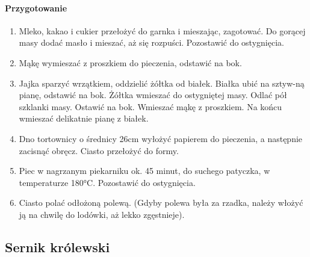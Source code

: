 \documentclass{article}
\begin{document}
    \paragraph{Przygotowanie}
    \begin{enumerate}
        \item Mleko, kakao i cukier przełożyć do garnka i mieszając, zagotować.
            Do gorącej masy dodać masło i mieszać, aż się rozpuści.  Pozostawić
            do ostygnięcia.
        \item Mąkę wymieszać z proszkiem do pieczenia, odstawić na bok.
        \item Jajka sparzyć wrzątkiem, oddzielić żółtka od białek. Białka ubić
            na sztyw-ną pianę, odstawić na bok. Żółtka wmieszać do ostygniętej
            masy. Odlać pół szklanki masy. Ostawić na bok. Wmieszać mąkę z
            proszkiem. Na końcu wmieszać delikatnie pianę z białek.
        \item Dno tortownicy o średnicy 26cm wyłożyć papierem do pieczenia, a
            następnie zacisnąć obręcz. Ciasto przełożyć do formy.
        \item Piec w nagrzanym piekarniku ok. 45 minut, do suchego patyczka, w
            temperaturze 180°C. Pozostawić do ostygnięcia.
        \item Ciasto polać odłożoną polewą. (Gdyby polewa była za rzadka, należy
            włożyć ją na chwilę do lodówki, aż lekko zgęstnieje).
    \end{enumerate}
    \newpage


    \subsection{Sernik królewski}
    \bigskip
\end{document}
